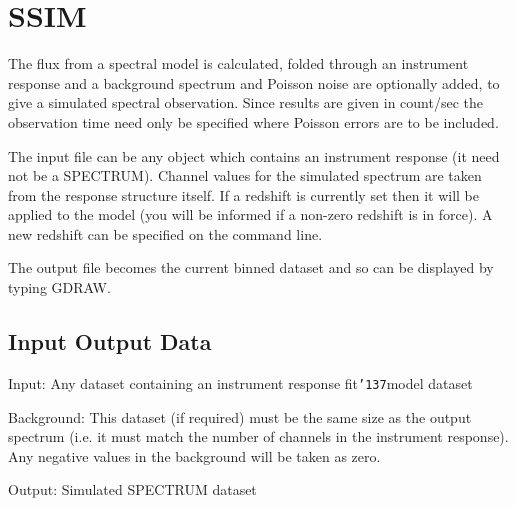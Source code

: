 \documentclass{book}
\renewcommand{\_}{{\tt\char'137}}     %
\begin{document}
\section{SSIM}
The flux from a spectral model is calculated, folded through
an instrument response and a background spectrum and Poisson
noise are optionally added, to give a simulated spectral
observation. Since results are given in count/sec the
observation time need only be specified where Poisson errors
are to be included.

The input file can be any object which contains an
instrument response (it need not be a SPECTRUM). Channel
values for the simulated spectrum are taken from the response
structure itself. If a redshift is currently set then it will
be applied to the model (you will be informed if a non-zero
redshift is in force). A new redshift can be specified on the
command line.

The output file becomes the current binned dataset
and so can be displayed by typing GDRAW.

\subsection{Input Output Data}
Input: Any dataset containing an instrument response
fit\_model dataset

Background: This dataset (if required) must be the same size
as the output spectrum (i.e. it must match the
number of channels in the instrument response).
Any negative values in the background will be taken
as zero.

Output: Simulated SPECTRUM dataset
\end{document}
